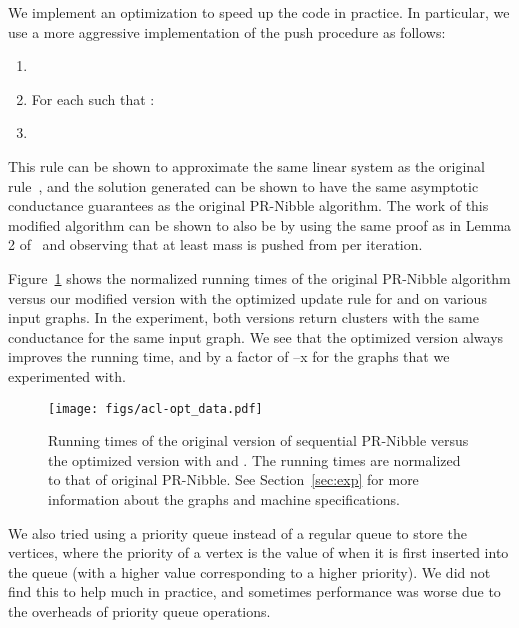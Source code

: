  We implement an optimization to speed
up the code in practice.  
In particular, we use a more
aggressive implementation of the push procedure as follows:
\begin{enumerate}[itemsep=0pt,topsep=3pt]
\item 
\item For each  such that : \par
 \hspace{4ex} 
\item 
\end{enumerate}
This rule can be shown to approximate the same linear system as the
original rule~\cite{Andersen2006}, and the solution generated can be
shown to have the same asymptotic conductance guarantees as the
original PR-Nibble algorithm.
The work of this
modified algorithm can be shown to also be  by
using the same proof as in Lemma 2 of~\cite{Andersen2006} and
observing that at least  mass is pushed from  per iteration.



Figure~\ref{fig:acl-opt} shows the normalized running times of the
original PR-Nibble algorithm versus our modified version with the optimized update rule for  and  on various input graphs.  In
the experiment, both versions return clusters with the same
conductance for the same input graph.  We see that the optimized
version always improves the running time, and by a factor of
--x for the graphs that we experimented with.



\begin{figure}[!t]
\centering
\vspace{-10pt}
\texttt{[image: figs/acl-opt\_data.pdf]}
\vspace{-4pt}
\caption{Running times of the original version of sequential PR-Nibble
  versus the optimized version with  and
  . The running times are normalized to that of
  original PR-Nibble. See Section~\ref{sec:exp} for more information about the graphs and machine specifications.}
\label{fig:acl-opt}
\vspace{-3pt}
\end{figure}




We also tried using a priority queue instead of a
regular queue to store the vertices, where the priority of a vertex
 is the value of  when it is first inserted into the
queue (with a higher value corresponding to a higher priority). We did
not find this to help much in practice, and sometimes performance was
worse due to the overheads of priority queue operations.





